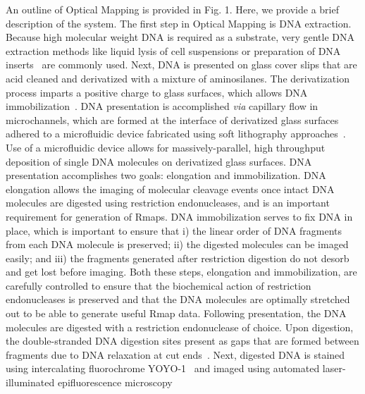 \documentclass{bmcart}
\begin{document}

An outline of Optical Mapping is provided in Fig. 1. Here, we provide a brief description of the system. The first step in Optical Mapping is DNA extraction. Because high molecular weight DNA is required as a substrate, very gentle DNA extraction methods like liquid lysis of cell suspensions or preparation of DNA 
inserts~\cite{Schwartz1984} are commonly used. Next, DNA is presented on 
glass cover slips that are acid cleaned and derivatized with a mixture of aminosilanes. The derivatization process imparts a positive charge to glass 
surfaces, which allows DNA immobilization~\cite{Meng1995, Cai1995, Hu1997, 
Lim2001}. DNA presentation is accomplished \emph{via} capillary flow 
in microchannels, which are formed at the interface of derivatized glass 
surfaces adhered to a microfluidic device fabricated using soft lithography 
approaches~\cite{Dimalanta2004}. Use of a microfluidic device allows for 
massively-parallel, high throughput deposition of single DNA molecules on 
derivatized glass surfaces. DNA presentation accomplishes two goals: elongation 
and immobilization. DNA elongation allows the imaging of molecular cleavage 
events once intact DNA molecules are digested using restriction endonucleases, 
and is an important requirement for generation of Rmaps. DNA immobilization 
serves to fix DNA in place, which is important to ensure that i) the linear 
order of DNA fragments from each DNA molecule is preserved; ii) the digested 
molecules can be imaged easily; and iii) the fragments generated after 
restriction digestion do not desorb and get lost before imaging. Both these 
steps, elongation and immobilization, are carefully controlled to ensure that 
the biochemical action of restriction endonucleases is preserved and that the 
DNA molecules are optimally stretched out to be able to generate useful Rmap 
data. Following presentation, the DNA molecules are digested with a restriction endonuclease of choice. Upon digestion, the double-stranded DNA digestion sites present as gaps that are formed between fragments due to DNA relaxation at cut 
ends~\cite{Schwartz1993, Meng1995}. Next, digested DNA is stained 
using intercalating fluorochrome YOYO-1~\cite{Cai1995} and imaged using 
automated laser-illuminated epifluorescence microscopy 
\end{document}
